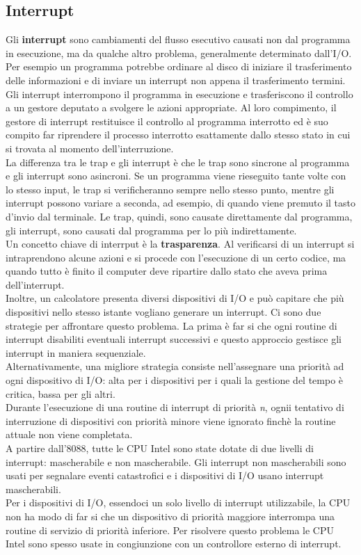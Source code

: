 \documentclass[12pt]{report}
\begin{document}
		\subsection{Interrupt}
		Gli \textbf{interrupt} sono cambiamenti del flusso esecutivo causati non dal programma in esecuzione, ma da qualche altro problema, generalmente determinato dall'I/O. \\
		Per esempio un programma potrebbe ordinare al disco di iniziare il trasferimento delle informazioni e di inviare un interrupt non appena il trasferimento termini. Gli interrupt interrompono il programma in esecuzione e trasferiscono il controllo a un gestore deputato a svolgere le azioni appropriate. Al loro compimento, il gestore di interrupt restituisce il controllo al programma interrotto ed è suo compito far riprendere il processo interrotto esattamente dallo stesso stato in cui si trovata al momento dell'interruzione. \\
		La differenza tra le trap e gli interrupt è che le trap sono sincrone al programma e gli interrupt sono asincroni. Se un programma viene rieseguito tante volte con lo stesso input, le trap si verificheranno sempre nello stesso punto, mentre gli interrupt possono variare a seconda, ad esempio, di quando viene premuto il tasto d'invio dal terminale. Le trap, quindi, sono causate direttamente dal programma, gli interrupt, sono causati dal programma per lo più indirettamente. \\
		Un concetto chiave di interrput è la \textbf{trasparenza}. Al verificarsi di un interrupt si intraprendono alcune azioni e si procede con l'esecuzione di un certo codice, ma quando tutto è finito il computer deve ripartire dallo stato che aveva prima dell'interrupt. \\
		Inoltre, un calcolatore presenta diversi dispositivi di I/O e può capitare che più dispositivi nello stesso istante vogliano generare un interrupt. Ci sono due strategie per affrontare questo problema. La prima è far si che ogni routine di interrupt disabiliti eventuali interrupt successivi e questo approccio gestisce gli interrupt in maniera sequenziale. \\
		Alternativamente, una migliore strategia consiste nell'assegnare una priorità ad ogni dispositivo di I/O: alta per i dispositivi per i quali la gestione del tempo è critica, bassa per gli altri. \\
		Durante l'esecuzione di una routine di interrupt di priorità \textit{n}, ognii tentativo di interruzione di dispositivi con priorità minore viene ignorato finchè la routine attuale non viene completata. \\
		A partire dall'8088, tutte le CPU Intel sono state dotate di due livelli di interrupt: mascherabile e non mascherabile. Gli interrupt non mascherabili sono usati per segnalare eventi catastrofici e i dispositivi di I/O usano interrupt mascherabili. \\
		Per i dispositivi di I/O, essendoci un solo livello di interrupt utilizzabile, la CPU non ha modo di far si che un dispositivo di priorità maggiore interrompa una routine di servizio di priorità inferiore. Per risolvere questo problema le CPU Intel sono spesso usate in congiunzione con un controllore esterno di interrupt.
\end{document}
